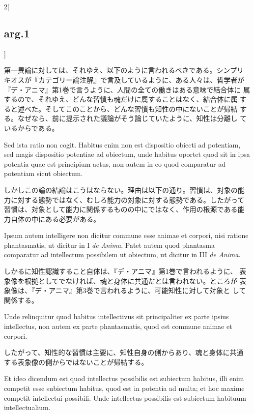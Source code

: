 \documentclass[paper=a4paper,fontsize=10pt,jafontsize=9pt,titlepage]{jlreq}
\begin{document}
\begin{paracol}{2}[\subsection{arg.1}]
\switchcolumn

第一異論に対しては、それゆえ、以下のように言われるべきである。シンプリ
キオスが『カテゴリー論注解』で言及しているように、ある人々は、哲学者が
『デ・アニマ』第1巻で言うように、人間の全ての働きはある意味で結合体に
属するので、それゆえ、どんな習慣も魂だけに属することはなく、結合体に属
すると述べた。そしてこのことから、どんな習慣も知性の中にないことが帰結
する。なぜなら、前に提示された議論がそう論じていたように、知性は分離し
ているからである。

\switchcolumn*

Sed ista ratio non cogit. Habitus enim non est dispositio obiecti ad
potentiam, sed magis dispositio potentiae ad obiectum, unde habitus
oportet quod sit in ipsa potentia quae est principium actus, non autem
in eo quod comparatur ad potentiam sicut obiectum.

\switchcolumn

しかしこの論の結論はこうはならない。理由は以下の通り。習慣は、対象の能
力に対する態勢ではなく、むしろ能力の対象に対する態勢である。したがって
習慣は、対象として能力に関係するものの中にではなく、作用の根源である能
力自体の中にある必要がある。

\switchcolumn*

Ipsum autem intelligere non dicitur commune esse animae et corpori,
nisi ratione phantasmatis, ut dicitur in I {\itshape de Anima}. Patet autem quod
phantasma comparatur ad intellectum possibilem ut obiectum, ut dicitur
in III {\itshape de Anima}.

\switchcolumn

しかるに知性認識すること自体は、『デ・アニマ』第1巻で言われるように、
表象像を根拠としてでなければ、魂と身体に共通だとは言われない。ところが
表象像は、『デ・アニマ』第3巻で言われるように、可能知性に対して対象と
して関係する。

\switchcolumn*

Unde relinquitur quod habitus intellectivus sit principaliter ex parte
ipsius intellectus, non autem ex parte phantasmatis, quod est commune
animae et corpori.

\switchcolumn

したがって、知性的な習慣は主要に、知性自身の側からあり、魂と身体に共通
する表象像の側からではないことが帰結する。

\switchcolumn*

Et ideo dicendum est quod intellectus possibilis est subiectum
habitus, illi enim competit esse subiectum habitus, quod est in
potentia ad multa; et hoc maxime competit intellectui possibili. Unde
intellectus possibilis est subiectum habituum intellectualium.


\end{paracol}
\end{document}
